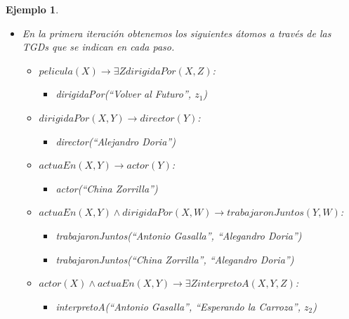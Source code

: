 \documentclass[11pt,a4paper,twoside]{tesis}
\newtheorem{exmp}{Ejemplo}
\begin{document}
\begin{exmp}
    \begin{itemize}
        \item En la primera iteración obtenemos los siguientes átomos a través de las TGDs que se indican en cada paso.
        \begin{itemize}
            \item $pelicula(X) \rightarrow \exists Z dirigidaPor(X, Z)$:
            \begin{itemize}
                \item \textit{dirigidaPor(``Volver al Futuro'', $z_1$)}
            \end{itemize}
            \item $dirigidaPor(X, Y) \rightarrow director(Y)$:
            \begin{itemize}
                \item  \textit{director(``Alejandro Doria'')}
            \end{itemize}
            \item $actuaEn(X, Y) \rightarrow actor(Y)$:
            \begin{itemize}
                \item  \textit{actor(``China Zorrilla'')}
            \end{itemize}
            \item $actuaEn(X, Y) \land dirigidaPor(X, W) \rightarrow trabajaronJuntos(Y, W) $:
            \begin{itemize}
                \item  \textit{trabajaronJuntos(``Antonio Gasalla'', ``Alegandro Doria'')}
                \item  \textit{trabajaronJuntos(``China Zorrilla'', ``Alegandro Doria'')}
            \end{itemize}            
            \item $actor(X) \land actuaEn(X, Y) \rightarrow \exists Z interpretoA(X, Y, Z)$:
            \begin{itemize}
                \item  \textit{interpretoA(``Antonio Gasalla'', ``Esperando la Carroza'', $z_2$)}
            \end{itemize}
        \end{itemize}


\end{itemize}
\end{exmp}
\end{document}
